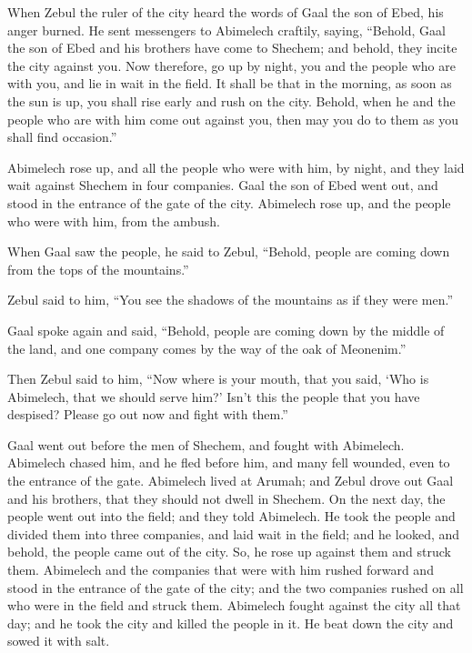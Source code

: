  When Zebul the ruler of the city heard the words of Gaal
the son of Ebed, his anger burned.  He sent messengers to
Abimelech craftily, saying, ``Behold, Gaal the son of Ebed and his
brothers have come to Shechem; and behold, they incite the city against
you.  Now therefore, go up by night, you and the people who
are with you, and lie in wait in the field.  It shall be
that in the morning, as soon as the sun is up, you shall rise early and
rush on the city. Behold, when he and the people who are with him come
out against you, then may you do to them as you shall find occasion.''

 Abimelech rose up, and all the people who were with him,
by night, and they laid wait against Shechem in four companies.
 Gaal the son of Ebed went out, and stood in the entrance
of the gate of the city. Abimelech rose up, and the people who were with
him, from the ambush.

 When Gaal saw the people, he said to Zebul, ``Behold,
people are coming down from the tops of the mountains.''

Zebul said to him, ``You see the shadows of the mountains as if they
were men.''

 Gaal spoke again and said, ``Behold, people are coming
down by the middle of the land, and one company comes by the way of the
oak of Meonenim.''

 Then Zebul said to him, ``Now where is your mouth, that
you said, `Who is Abimelech, that we should serve him?' Isn't this the
people that you have despised? Please go out now and fight with them.''

 Gaal went out before the men of Shechem, and fought with
Abimelech.  Abimelech chased him, and he fled before him,
and many fell wounded, even to the entrance of the gate. 
Abimelech lived at Arumah; and Zebul drove out Gaal and his brothers,
that they should not dwell in Shechem.  On the next day,
the people went out into the field; and they told Abimelech.
 He took the people and divided them into three companies,
and laid wait in the field; and he looked, and behold, the people came
out of the city. So, he rose up against them and struck them.
 Abimelech and the companies that were with him rushed
forward and stood in the entrance of the gate of the city; and the two
companies rushed on all who were in the field and struck them.
 Abimelech fought against the city all that day; and he
took the city and killed the people in it. He beat down the city and
sowed it with salt.

